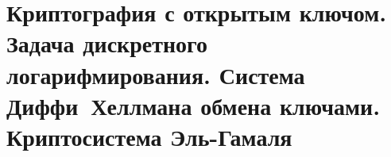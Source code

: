 \section{Криптография с открытым ключом. Задача дискретного логарифмирования. Система Диффи~Хеллмана обмена ключами. Криптосистема Эль-Гамаля}
